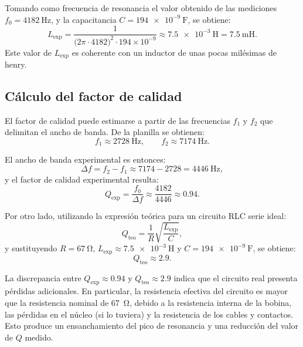 \documentclass[a4paper,12pt]{article}
\begin{document}
Tomando como frecuencia de resonancia el valor obtenido de las mediciones \( f_0 = \SI{4182}{\hertz} \), y la capacitancia \( C = \SI{194e-9}{\farad} \), se obtiene:
\[
L_{\text{exp}} = \frac{1}{\bigl(2\pi \cdot 4182\bigr)^2 \cdot 194\times 10^{-9}}
               \approx \SI{7.5e-3}{\henry}
               = \SI{7.5}{\milli\henry}.
\]
Este valor de \( L_{\text{exp}} \) es coherente con un inductor de unas pocas milésimas de henry.

\subsection{Cálculo del factor de calidad}
El factor de calidad puede estimarse a partir de las frecuencias \( f_1 \) y \( f_2 \) que delimitan el ancho de banda. De la planilla se obtienen:
\[
f_1 \approx \SI{2728}{\hertz}, \qquad
f_2 \approx \SI{7174}{\hertz}.
\]

El ancho de banda experimental es entonces:
\[
\Delta f = f_2 - f_1 \approx 7174 - 2728 = \SI{4446}{\hertz},
\]
y el factor de calidad experimental resulta:
\[
Q_{\text{exp}} = \frac{f_0}{\Delta f}
               \approx \frac{4182}{4446}
               \approx 0.94.
\]

Por otro lado, utilizando la expresión teórica para un circuito RLC serie ideal:
\[
Q_{\text{teo}} = \frac{1}{R}\sqrt{\frac{L_{\text{exp}}}{C}},
\]
y sustituyendo \( R = \SI{67}{\ohm} \), \( L_{\text{exp}} \approx \SI{7.5e-3}{\henry} \) y \( C = \SI{194e-9}{\farad} \), se obtiene:
\[
Q_{\text{teo}} \approx 2.9.
\]

La discrepancia entre \( Q_{\text{exp}} \approx 0.94 \) y \( Q_{\text{teo}} \approx 2.9 \) indica que el circuito real presenta pérdidas adicionales. En particular, la resistencia efectiva del circuito es mayor que la resistencia nominal de \SI{67}{\ohm}, debido a la resistencia interna de la bobina, las pérdidas en el núcleo (si lo tuviera) y la resistencia de los cables y contactos. Esto produce un ensanchamiento del pico de resonancia y una reducción del valor de \( Q \) medido.
\end{document}
